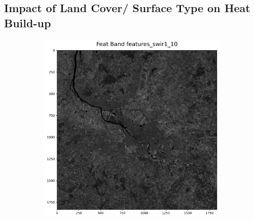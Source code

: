 \documentclass[12pt,a4paper, english,twoside]{scrartcl}
\begin{document}
    \subsection{Impact of Land Cover/ Surface Type on Heat Build-up}
      \begin{figure}
        \vspace{-0.5cm}
        \centering
        \begin{subfigure}[b]{0.38\textwidth}
          \includegraphics[width=\textwidth]{img/Features_swir10.png}
        \end{subfigure}


\end{figure}
\end{document}
